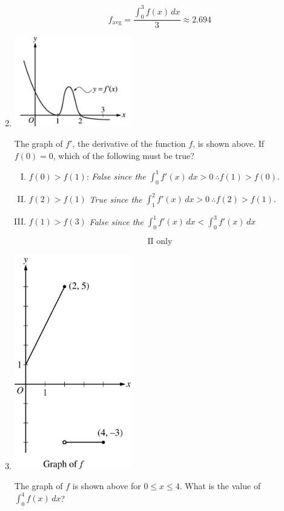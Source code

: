 \documentclass[12pt]{article}
\begin{document}
\begin{enumerate}
    $$ f_{\text{avg}}= \frac{\int_{0}^{3} f(x) \, dx}{3} \approx  \boxed{2.694}$$
    \item 
    \begin{center}
        \includegraphics[width=2in]{original-23.png}
    \end{center}
    The graph of $f'$, the derivative of the function $f$, is shown above. If $f(0) = 0$, which of the following must be true?
    \begin{enumerate}[I.]
        \item $f(0) > f(1)$: \textit{False since the} $\int_{0}^{1} f'(x) \, dx > 0 \: \therefore f(1)>f(0).$
        \item $ f(2) > f(1)$ \textit{True since the} $\int_{1}^{2} f'(x) \, dx > 0 \: \therefore f(2)>f(1).$
        \item $f(1) > f(3)$ \textit{False since the} $\int_{0}^{1} f'(x) \, dx < \int_{0}^{3} f'(x) \, dx$
    \end{enumerate}
    $$\boxed{\text{II only}}$$
    \item 
    \begin{center}
        \includegraphics[width=2in]{original-24.png}
    \end{center}
    The graph of $f$ is shown above for $0 \leq x \leq 4$. What is the value of $\int_{0}^{4} f(x) \, dx$?

\end{enumerate}
\end{document}
